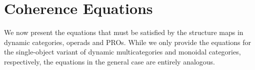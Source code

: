 \documentclass{eptcs}
\theoremstyle{definition}
\theoremstyle{plain}
\newtheorem{theorem}[definitionx]{Theorem}
\newcommand{\0}{\textsf{0}}
\newcommand{\1}{\tn{\textsf{1}}}
\newcommand{\bnote}[1]{{\color{red}Brandon says:}~#1\quad{\color{red}$\lozenge$}}
\begin{document}
%
%
%
%




\appendix
\section{Coherence Equations}\label{coherences}


We now present the equations that must be satisfied by the structure maps in dynamic categories, operads and PROs. While we only provide the equations for the single-object variant of dynamic multicategories and monoidal categories, respectively, the equations in the general case are entirely analogous.
\end{document}

